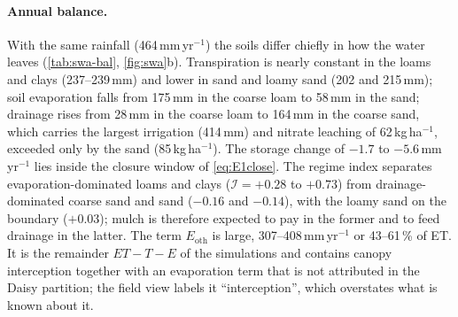 \documentclass[preprint,12pt]{elsarticle}
\begin{document}
\paragraph{Annual balance.} With the same rainfall (464\,mm\,yr$^{-1}$) the soils differ chiefly in how the water leaves (\cref{tab:swa-bal}, \cref{fig:swa}b). Transpiration is nearly constant in the loams and clays (237--239\,mm) and lower in sand and loamy sand (202 and 215\,mm); soil evaporation falls from 175\,mm in the coarse loam to 58\,mm in the sand; drainage rises from 28\,mm in the coarse loam to 164\,mm in the coarse sand, which carries the largest irrigation (414\,mm) and nitrate leaching of 62\,kg\,ha$^{-1}$, exceeded only by the sand (85\,kg\,ha$^{-1}$). The storage change of $-1.7$ to $-5.6$\,mm\,yr$^{-1}$ lies inside the closure window of \cref{eq:E1close}. The regime index separates evaporation-dominated loams and clays ($\mathcal I=+0.28$ to $+0.73$) from drainage-dominated coarse sand and sand ($-0.16$ and $-0.14$), with the loamy sand on the boundary ($+0.03$); mulch is therefore expected to pay in the former and to feed drainage in the latter. The term $E_{\mathrm{oth}}$ is large, 307--408\,mm\,yr$^{-1}$ or 43--61\,\% of ET. It is the remainder $\mathit{ET}-T-E$ of the simulations and contains canopy interception together with an evaporation term that is not attributed in the Daisy partition; the field view labels it ``interception'', which overstates what is known about it.
\end{document}
